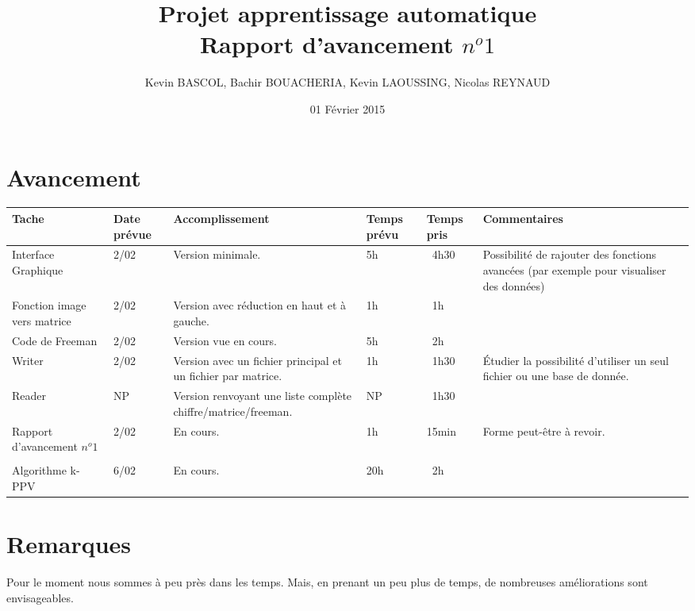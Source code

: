 \documentclass[10pt,a4paper, landscape]{report}
\author{Kevin BASCOL, Bachir BOUACHERIA, Kevin LAOUSSING, Nicolas REYNAUD}
\title{Projet apprentissage automatique\\Rapport d'avancement $n^o 1$}
\date{\vfill 01 Février 2015}
\begin{document}
\maketitle

\section*{Avancement}
\begin{center}
	\bgroup
	\def\arraystretch{1.5}
	\begin{tabular}{|p{7cm}|p{1cm}|p{7cm}|p{2cm}|p{2cm}|p{7cm}|}
		\hline
		\rowcolor{gris}Tache & Date prévue & Accomplissement & Temps prévu & Temps pris & Commentaires\\
		\hline
		Interface Graphique & 2/02 & Version minimale. & 5h & ~4h30 & Possibilité de rajouter des fonctions avancées (par exemple pour visualiser des données)\\
		\hline
		Fonction image vers matrice & 2/02 & Version avec réduction en haut et à gauche. & 1h & ~1h & \\
		\hline
		Code de Freeman & 2/02 & Version vue en cours. & 5h & ~2h & \\
		\hline
		Writer & 2/02 & Version avec un fichier principal et un fichier par matrice. & 1h & ~1h30 & Étudier la possibilité d'utiliser un seul fichier ou une base de donnée.\\
		\hline
		Reader & NP & Version renvoyant une liste complète chiffre/matrice/freeman. & NP & ~1h30 & \\
		\hline
		Rapport d'avancement $n^o 1$ & 2/02 & En cours. & 1h & 15min & Forme peut-être à revoir.\\
		\hline
		\rowcolor{gris} & & & & & \\
		Algorithme k-PPV & 6/02 & En cours. & 20h & ~2h & \\
		\hline
	\end{tabular}
	\egroup
\end{center}

\section*{Remarques}
Pour le moment nous sommes à peu près dans les temps. Mais, en prenant un peu plus de temps, de nombreuses améliorations sont envisageables.
\end{document}
